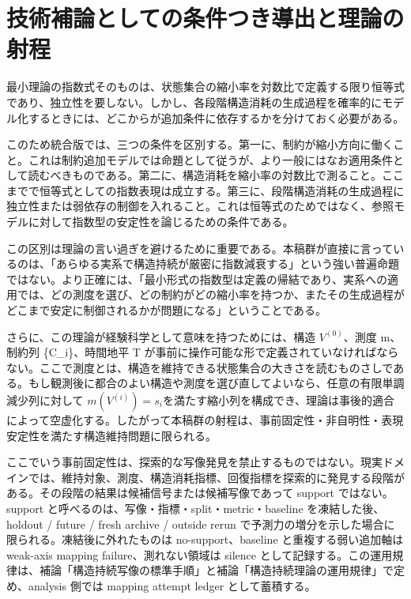\documentclass[12pt,a4paper]{article}
\begin{document}
\section{技術補論としての条件つき導出と理論の射程}\label{ux6280ux8853ux88dcux8ad6ux3068ux3057ux3066ux306eux6761ux4ef6ux3064ux304dux5c0eux51faux3068ux7406ux8ad6ux306eux5c04ux7a0b}

最小理論の指数式そのものは、状態集合の縮小率を対数比で定義する限り恒等式であり、独立性を要しない。しかし、各段階構造消耗の生成過程を確率的にモデル化するときには、どこからが追加条件に依存するかを分けておく必要がある。

このため統合版では、三つの条件を区別する。第一に、制約が縮小方向に働くこと。これは制約追加モデルでは命題として従うが、より一般にはなお適用条件として読むべきものである。第二に、構造消耗を縮小率の対数比で測ること。ここまでで恒等式としての指数表現は成立する。第三に、段階構造消耗の生成過程に独立性または弱依存の制御を入れること。これは恒等式のためではなく、参照モデルに対して指数型の安定性を論じるための条件である。

この区別は理論の言い過ぎを避けるために重要である。本稿群が直接に言っているのは、「あらゆる実系で構造持続が厳密に指数減衰する」という強い普遍命題ではない。より正確には、「最小形式の指数型は定義の帰結であり、実系への適用では、どの測度を選び、どの制約がどの縮小率を持つか、またその生成過程がどこまで安定に制御されるかが問題になる」ということである。

さらに、この理論が経験科学として意味を持つためには、構造 \(V^{(0)}\)、測度 m、制約列 \{C\_i\}、時間地平 T が事前に操作可能な形で定義されていなければならない。ここで測度とは、構造を維持できる状態集合の大きさを読むものさしである。もし観測後に都合のよい構造や測度を選び直してよいなら、任意の有限単調減少列に対して \(m(V^{(i)}) = s_{i}\)を満たす縮小列を構成でき、理論は事後的適合によって空虚化する。したがって本稿群の射程は、事前固定性・非自明性・表現安定性を満たす構造維持問題に限られる。

ここでいう事前固定性は、探索的な写像発見を禁止するものではない。現実ドメインでは、維持対象、測度、構造消耗指標、回復指標を探索的に発見する段階がある。その段階の結果は候補信号または候補写像であって support ではない。support と呼べるのは、写像・指標・split・metric・baseline を凍結した後、holdout / future / fresh archive / outside rerun で予測力の増分を示した場合に限られる。凍結後に外れたものは no-support、baseline と重複する弱い追加軸は weak-axis mapping failure、測れない領域は silence として記録する。この運用規律は、補論「構造持続写像の標準手順」と補論「構造持続理論の運用規律」で定め、analysis 側では mapping attempt ledger として蓄積する。
\end{document}
